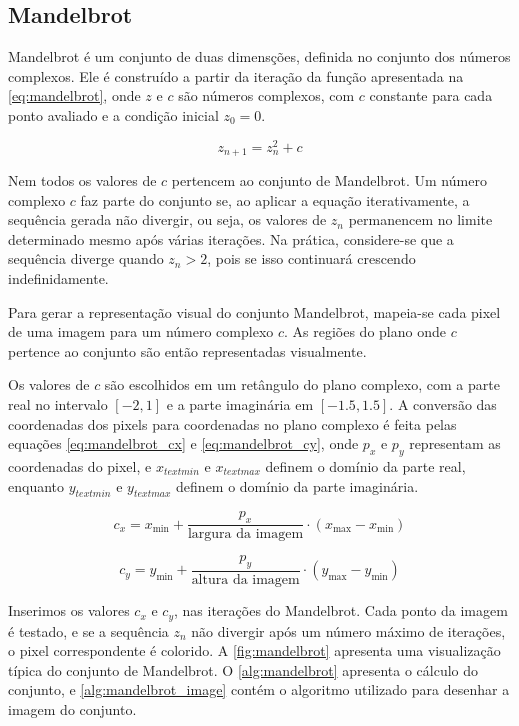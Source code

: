 \subsection{Mandelbrot}\label{subsec:mandelbrot}

Mandelbrot é um conjunto de duas dimensções, definida no conjunto dos números complexos. Ele é construído a partir da iteração da função apresentada na \autoref{eq:mandelbrot}, onde $z$ e $c$ são números complexos, com $c$ constante para cada ponto avaliado e a condição inicial $z_0 = 0$.

\begin{equation}
	\label{eq:mandelbrot}
	z_{n + 1} = z_n^{2} + c
\end{equation}

Nem todos os valores de $c$ pertencem ao conjunto de Mandelbrot. Um número complexo $c$ faz parte do conjunto se, ao aplicar a equação iterativamente, a sequência gerada não divergir, ou seja, os valores de $z_n$ permanencem no limite determinado mesmo após várias iterações. Na prática, considere-se que a sequência diverge quando $z_n > 2$, pois se isso continuará crescendo indefinidamente.

Para gerar a representação visual do conjunto Mandelbrot, mapeia-se cada pixel de uma imagem para um número complexo $c$. As regiões do plano onde $c$ pertence ao conjunto são então representadas visualmente.

Os valores de $c$ são escolhidos em um retângulo do plano complexo, com a parte real no intervalo $[-2, 1]$ e a parte imaginária em $[-1.5, 1.5]$. A conversão das coordenadas dos pixels para coordenadas no plano complexo é feita pelas equações \autoref{eq:mandelbrot_cx} e \autoref{eq:mandelbrot_cy}, onde $p_x$ e $p_y$ representam as coordenadas do pixel, e $x_{text{min}}$ e $x_{text{max}}$ definem o domínio da parte real, enquanto $y_{text{min}}$ e $y_{text{max}}$ definem o domínio da parte imaginária.

\begin{equation}
	\label{eq:mandelbrot_cx}
	c_x = x_{\text{min}} + \frac{p_x}{\text{largura da imagem}} \cdot (x_{\text{max}} - x_{\text{min}})
\end{equation}

\begin{equation}
	\label{eq:mandelbrot_cy}
	c_y = y_{\text{min}} + \frac{p_y}{\text{altura da imagem}} \cdot (y_{\text{max}} - y_{\text{min}})
\end{equation}

Inserimos os valores $c_x$ e $c_y$, nas iterações do Mandelbrot. Cada ponto da imagem é testado, e se a sequência $z_n$ não divergir após um número máximo de iterações, o pixel correspondente é colorido. A \autoref{fig:mandelbrot} apresenta uma visualização típica do conjunto de Mandelbrot. O \autoref{alg:mandelbrot} apresenta o cálculo do conjunto, e \autoref{alg:mandelbrot_image} contém o algoritmo utilizado para desenhar a imagem do conjunto.

